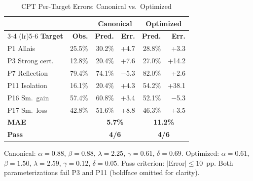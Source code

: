 \documentclass[journal]{IEEEtran}
\begin{document}
\begin{table}[!h]
\renewcommand{\arraystretch}{1.15}
\caption{CPT Per-Target Errors: Canonical vs.\ Optimized}
\label{tab:cpt_detail}
\centering
\begin{tabular}{l r r r r r}
\toprule
& & \multicolumn{2}{c}{\textbf{Canonical}} & \multicolumn{2}{c}{\textbf{Optimized}} \\
\cmidrule(lr){3-4} \cmidrule(lr){5-6}
\textbf{Target} & \textbf{Obs.} & \textbf{Pred.} & \textbf{Err.} & \textbf{Pred.} & \textbf{Err.} \\
\midrule
P1 Allais       & 25.5\% & 30.2\% & +4.7  & 28.8\% & +3.3  \\
P3 Strong cert.  & 12.8\% & 20.4\% & +7.6  & 27.0\% & +14.2 \\
P7 Reflection   & 79.4\% & 74.1\% & $-$5.3 & 82.0\% & +2.6  \\
P11 Isolation   & 16.1\% & 20.4\% & +4.3  & 54.2\% & +38.1 \\
P16 Sm.\ gain   & 57.4\% & 60.8\% & +3.4  & 52.1\% & $-$5.3 \\
P17 Sm.\ loss   & 42.8\% & 51.6\% & +8.8  & 46.3\% & +3.5  \\
\midrule
\textbf{MAE}    &        & \multicolumn{2}{c}{\textbf{5.7\%}} & \multicolumn{2}{c}{\textbf{11.2\%}} \\
\textbf{Pass}   &        & \multicolumn{2}{c}{\textbf{4/6}}   & \multicolumn{2}{c}{\textbf{4/6}}   \\
\bottomrule
\end{tabular}
\begin{flushleft}
\footnotesize{Canonical: $\alpha=0.88$, $\beta=0.88$, $\lambda=2.25$, $\gamma=0.61$, $\delta=0.69$.
Optimized: $\alpha=0.61$, $\beta=1.50$, $\lambda=2.59$, $\gamma=0.12$, $\delta=0.05$.
Pass criterion: $|\text{Error}| \leq 10$~pp.
Both parameterizations fail P3 and P11 (boldface omitted for clarity).}
\end{flushleft}
\end{table}

\end{document}
